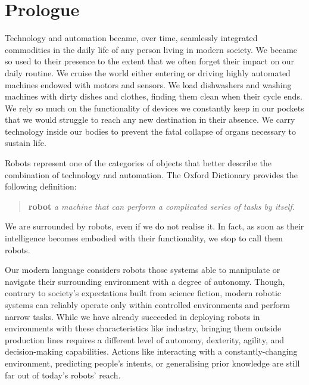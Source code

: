 \cleardoublepage
{}
{}

\chapter*{Prologue}

Technology and automation became, over time, seamlessly integrated commodities in the daily life of any person living in modern society.
We became so used to their presence to the extent that we often forget their impact on our daily routine.
We cruise the world either entering or driving highly automated machines endowed with motors and sensors.
We load dishwashers and washing machines with dirty dishes and clothes, finding them clean when their cycle ends.
We rely so much on the functionality of devices we constantly keep in our pockets that we would struggle to reach any new destination in their absence.
We carry technology inside our bodies to prevent the fatal collapse of organs necessary to sustain life.

Robots represent one of the categories of objects that better describe the combination of technology and automation.
The Oxford Dictionary provides the following definition:
%
\begin{quote}
    \hspace{-8.5mm}
    \textbf{robot} \textit{a machine that can perform a complicated series of tasks by itself.}
\end{quote}
%
We are surrounded by robots, even if we do not realise it.
In fact, as soon as their intelligence becomes embodied with their functionality, we stop to call them robots.

Our modern language considers robots those systems able to manipulate or navigate their surrounding environment with a degree of autonomy.
Though, contrary to society's expectations built from science fiction, modern robotic systems can reliably operate only within controlled environments and perform narrow tasks.
While we have already succeeded in deploying robots in environments with these characteristics like industry, bringing them outside production lines requires a different level of autonomy, dexterity, agility, and decision-making capabilities.
Actions like interacting with a constantly-changing environment, predicting people's intents, or generalising prior knowledge are still far out of today’s robots' reach.


